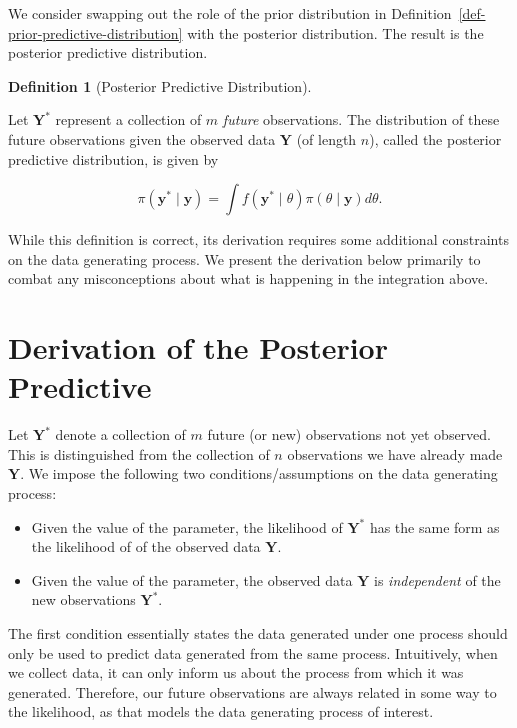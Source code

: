 \documentclass[
  letterpaper,
  DIV=11,
  numbers=noendperiod]{scrreprt}
\providecommand{\tightlist}{%
  \setlength{\itemsep}{0pt}\setlength{\parskip}{0pt}}\usepackage{longtable,booktabs,array}
\theoremstyle{definition}
\newtheorem{definition}{Definition}[chapter]
\theoremstyle{plain}
\theoremstyle{definition}
\theoremstyle{remark}
\begin{document}
We consider swapping out the role of the prior distribution in
Definition~\ref{def-prior-predictive-distribution} with the posterior
distribution. The result is the posterior predictive distribution.

\begin{definition}[Posterior Predictive
Distribution]\protect\hypertarget{def-posterior-predictive-distribution}{}\label{def-posterior-predictive-distribution}

Let \(\mathbf{Y}^*\) represent a collection of \(m\) \emph{future}
observations. The distribution of these future observations given the
observed data \(\mathbf{Y}\) (of length \(n\)), called the posterior
predictive distribution, is given by

\[\pi\left(\mathbf{y}^* \mid \mathbf{y}\right) = \int f\left(\mathbf{y}^* \mid \theta\right) \pi(\theta \mid \mathbf{y}) d\theta.\]

\end{definition}

While this definition is correct, its derivation requires some
additional constraints on the data generating process. We present the
derivation below primarily to combat any misconceptions about what is
happening in the integration above.

\hypertarget{derivation-of-the-posterior-predictive}{%
\section{Derivation of the Posterior
Predictive}\label{derivation-of-the-posterior-predictive}}

Let \(\mathbf{Y}^*\) denote a collection of \(m\) future (or new)
observations not yet observed. This is distinguished from the collection
of \(n\) observations we have already made \(\mathbf{Y}\). We impose the
following two conditions/assumptions on the data generating process:

\begin{itemize}
\tightlist
\item
  Given the value of the parameter, the likelihood of \(\mathbf{Y}^*\)
  has the same form as the likelihood of of the observed data
  \(\mathbf{Y}\).
\item
  Given the value of the parameter, the observed data \(\mathbf{Y}\) is
  \emph{independent} of the new observations \(\mathbf{Y}^*\).
\end{itemize}

The first condition essentially states the data generated under one
process should only be used to predict data generated from the same
process. Intuitively, when we collect data, it can only inform us about
the process from which it was generated. Therefore, our future
observations are always related in some way to the likelihood, as that
models the data generating process of interest.
\end{document}
